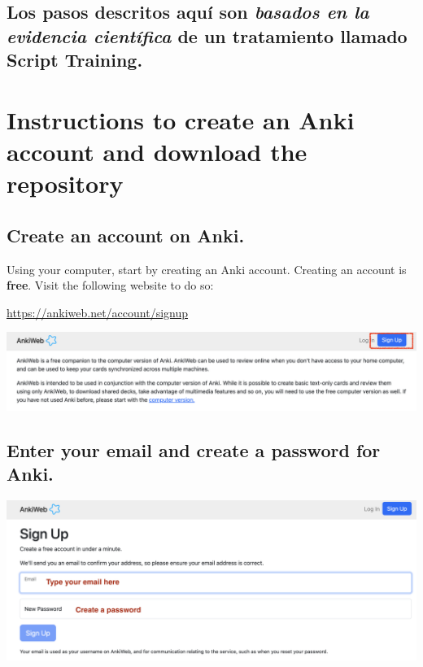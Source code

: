 \documentclass[
]{book}
\begin{document}
\hypertarget{los-pasos-descritos-aquuxed-son-basados-en-la-evidencia-cientuxedfica-de-un-tratamiento-llamado-script-training.}{%
\section{\texorpdfstring{Los pasos descritos aquí son \emph{basados en la evidencia científica} de un tratamiento llamado Script Training.}{Los pasos descritos aquí son basados en la evidencia científica de un tratamiento llamado Script Training.}}\label{los-pasos-descritos-aquuxed-son-basados-en-la-evidencia-cientuxedfica-de-un-tratamiento-llamado-script-training.}}

\hypertarget{cross_3}{%
\chapter{Instructions to create an Anki account and download the repository}\label{cross_3}}

\hypertarget{create-an-account-on-anki.}{%
\section{Create an account on Anki.}\label{create-an-account-on-anki.}}

Using your computer, start by creating an Anki account. Creating an account is \textbf{free}. Visit the following website to do so:

\url{https://ankiweb.net/account/signup}

\includegraphics[width=0.9\linewidth]{images/reposit_en/sign_up}

\hypertarget{cross_3}{%
\section{Enter your email and create a password for Anki.}\label{cross_3}}

\includegraphics[width=0.9\linewidth]{images/reposit_en/email_password}
\end{document}

